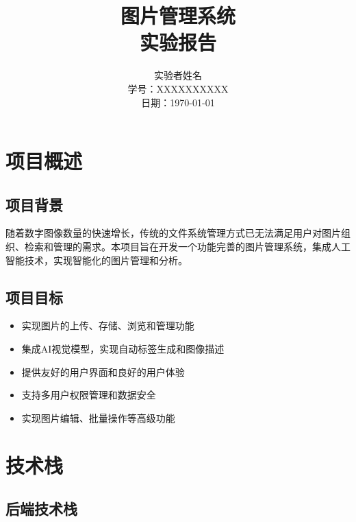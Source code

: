 \documentclass[12pt,a4paper]{article}
\title{\textbf{\Huge 图片管理系统\\实验报告}}
\author{
    \Large 实验者姓名 \\
    \normalsize 学号：XXXXXXXXXX \\
    \normalsize 日期：\today
}
\date{}
\begin{document}
\maketitle
\thispagestyle{empty}

\newpage
\tableofcontents
\newpage

\section{项目概述}

\subsection{项目背景}
随着数字图像数量的快速增长，传统的文件系统管理方式已无法满足用户对图片组织、检索和管理的需求。本项目旨在开发一个功能完善的图片管理系统，集成人工智能技术，实现智能化的图片管理和分析。

\subsection{项目目标}
\begin{itemize}
    \item 实现图片的上传、存储、浏览和管理功能
    \item 集成AI视觉模型，实现自动标签生成和图像描述
    \item 提供友好的用户界面和良好的用户体验
    \item 支持多用户权限管理和数据安全
    \item 实现图片编辑、批量操作等高级功能
\end{itemize}

\section{技术栈}

\subsection{后端技术栈}
\end{document}
